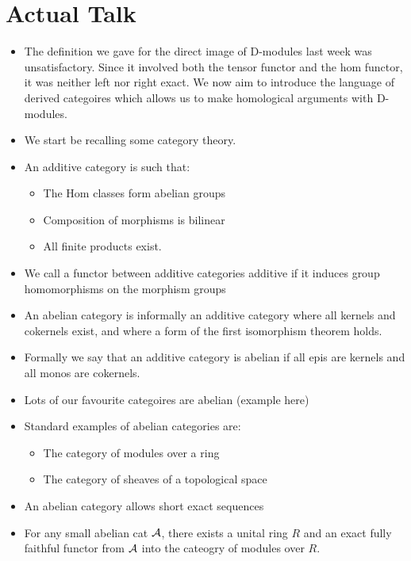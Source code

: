 \documentclass[a4paper]{article}
\begin{document}
\section{Actual Talk}
\begin{itemize}
    \item The definition we gave for the direct image of D-modules last week was unsatisfactory. Since it involved both the tensor functor and the hom functor, it was neither left nor right exact. We now aim to introduce the language of derived categoires which allows us to make homological arguments with D-modules.
    \item We start be recalling some category theory.
    \item An additive category is such that:
        \begin{itemize}
            \item The Hom classes form abelian groups
            \item Composition of morphisms is bilinear
            \item All finite products exist.
        \end{itemize}
    \item We call a functor between additive categories additive if it induces group homomorphisms on the morphism groups
    \item An abelian category is informally an additive category where all kernels and cokernels exist, and where a form of the first isomorphism theorem holds.
    \item Formally we say that an additive category is abelian if all epis are kernels and all monos are cokernels.
    \item Lots of our favourite categoires are abelian (example here)
    \item Standard examples of abelian categories are:
        \begin{itemize}
            \item The category of modules over a ring
            \item The category of sheaves of a topological space
        \end{itemize}
    \item An abelian category allows short exact sequences
    \item 
        \begin{Theorem}
            For any small abelian cat $\mathcal{A}$, there exists a unital ring $R$ and an exact fully faithful functor from $\mathcal{A}$ into the cateogry of modules over $R$.

\end{Theorem}
\end{itemize}
\end{document}
